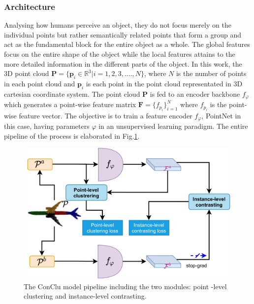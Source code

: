 \subsubsection{Architecture}
Analysing how humans perceive an object, they do not focus merely on the individual points but rather semantically related points that form a group and act as the fundamental block for the entire object as a whole. The global features focus on the entire shape of the object while the local features attains to the more detailed information in the different parts of the object. In this work, the 3D point cloud $\mathcal{\textbf{P}} = \{\textbf{p}_i \in \mathbb{R}^3| i= 1,2,3,....,N\}$, where $N$ is the number of points in each point cloud and $\textbf{p}_i$ is each point in the point cloud representated in 3D cartesian coordinate system. The point cloud $\mathcal{\textbf{P}}$ is fed to an encoder backbone $f_{\varphi}$ which generates a point-wise feature matrix $\mathcal{\textbf{F}} = \{ f_{p_i}\}_{i=1}^{N}$ where $f_{p_i}$ is the point-wise feature vector. The objective is to train a feature encoder $f_{\varphi}$, PointNet in this case, having parameters $\varphi$ in an unsupervised learning paradigm. The entire pipeline of the process is elaborated in Fig.\ref{fig:conclu_arch}.
\begin{figure}[h]
    \centering
    \includegraphics[width=320pt,height=200pt]{pictures/conclu_arch.jpg}
    \caption{The ConClu model pipeline including the two modules: point -level clustering and instance-level contrasting.\cite{mei2022unsupervised}}
    \label{fig:conclu_arch}
\end{figure} 
